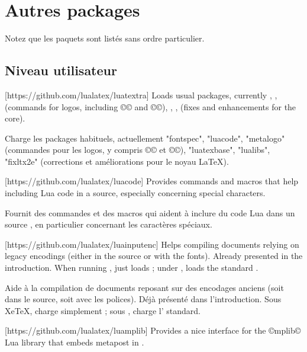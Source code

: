 \documentclass{lltxdoc}
\begin{document}
\section{Autres packages}\label{other}

Notez que les paquets sont listés sans ordre particulier.

\subsection{Niveau utilisateur}

[https://github.com/lualatex/luatextra]
Loads usual packages, currently , , 
(commands for logos, including ©\LuaTeX© and ©\LuaLaTeX©), ,
,  (fixes and enhancements for the \latex core).

Charge les packages habituels, actuellement "fontspec", "luacode", "metalogo" (commandes pour les logos, y compris ©\LuaTeX© et ©\LuaLaTeX©), "luatexbase", "lualibs", "fixltx2e" (corrections et améliorations pour le noyau LaTeX).

[https://github.com/lualatex/luacode]
Provides commands and macros that help including Lua code in a \tex source,
especially concerning special characters.

Fournit des commandes et des macros qui aident à inclure du code Lua dans un source \tex, en particulier concernant les caractères spéciaux.

[https://github.com/lualatex/luainputenc]
Helps compiling documents relying on legacy encodings (either in the source or
with the fonts). Already presented in the introduction. When running \xetex,
just loads ; under \pdftex, loads the standard
.

Aide à la compilation de documents reposant sur des encodages anciens (soit dans le source, soit avec les polices). Déjà présenté dans l'introduction. Sous XeTeX, charge simplement ; sous \pdftex, charge l' standard.

[https://github.com/lualatex/luamplib]
Provides a nice interface for the ©mplib© Lua library that embeds metapost in
\luatex.
\end{document}
